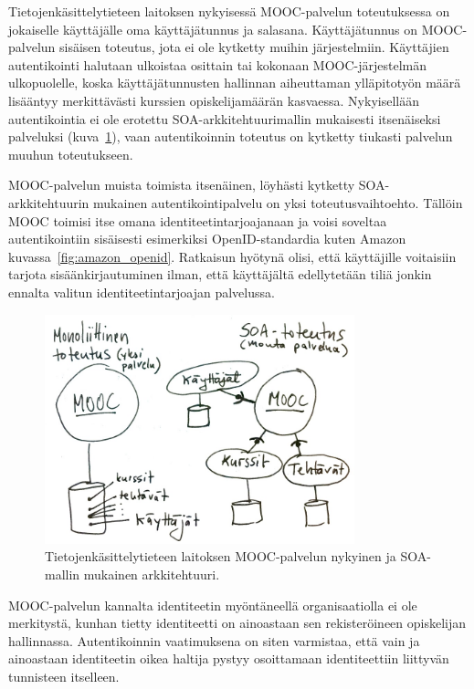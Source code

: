 \documentclass[finnish,gradu]{tktltiki}
\begin{document}
  Tietojenkäsittelytieteen laitoksen nykyisessä MOOC-palvelun toteutuksessa on jokaiselle käyttäjälle oma käyttäjätunnus ja salasana. Käyttäjätunnus on MOOC-palvelun sisäisen toteutus, jota ei ole kytketty muihin järjestelmiin. Käyttäjien autentikointi halutaan ulkoistaa osittain tai kokonaan MOOC-järjestelmän ulkopuolelle, koska käyttäjätunnusten hallinnan aiheuttaman ylläpitotyön määrä lisääntyy merkittävästi kurssien opiskelijamäärän kasvaessa. Nykyisellään autentikointia ei ole erotettu SOA-arkkitehtuurimallin mukaisesti itsenäiseksi palveluksi (kuva~\ref{fig:mooc-arkkitehtuuri}), vaan autentikoinnin toteutus on kytketty tiukasti palvelun muuhun toteutukseen.

  MOOC-palvelun muista toimista itsenäinen, löyhästi kytketty SOA-arkkitehtuurin mukainen autentikointipalvelu on yksi toteutusvaihtoehto. Tällöin MOOC toimisi itse omana identiteetintarjoajanaan ja voisi soveltaa autentikointiin sisäisesti esimerkiksi OpenID-standardia kuten Amazon kuvassa~\ref{fig:amazon_openid}. Ratkaisun hyötynä olisi, että käyttäjille voitaisiin tarjota sisäänkirjautuminen ilman, että käyttäjältä edellytetään tiliä jonkin ennalta valitun identiteetintarjoajan palvelussa.


  \begin{figure}[h!]
    \centering
    \includegraphics[width=0.8\textwidth]{images/mooc-arkkitehtuuri.jpg}
    \caption[MOOC-palvelun nykyinen ja SOA-mallin mukainen arkkitehtuuri.]{Tietojenkäsittelytieteen laitoksen MOOC-palvelun nykyinen ja SOA-mallin mukainen arkkitehtuuri.}
    \label{fig:mooc-arkkitehtuuri}
  \end{figure}

   MOOC-palvelun kannalta identiteetin myöntäneellä organisaatiolla ei ole merkitystä, kunhan tietty identiteetti on ainoastaan sen rekisteröineen opiskelijan hallinnassa. Autentikoinnin vaatimuksena on siten varmistaa, että vain ja ainoastaan identiteetin oikea haltija pystyy osoittamaan identiteettiin liittyvän tunnisteen itselleen.
\end{document}
